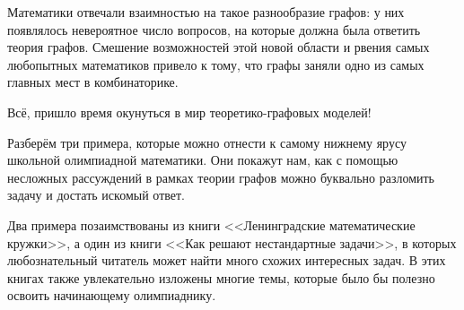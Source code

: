 	Математики отвечали взаимностью на такое разнообразие графов: у них появлялось невероятное число вопросов, на которые должна была ответить теория графов. Смешение возможностей этой новой области и рвения самых любопытных математиков привело к тому, что графы заняли одно из самых главных мест в комбинаторике. 

	Всё, пришло время окунуться в мир теоретико-графовых моделей!


	Разберём три примера, которые можно отнести к самому нижнему ярусу школьной олимпиадной математики. Они покажут нам, как с помощью несложных рассуждений в рамках теории графов можно буквально разломить задачу и достать искомый ответ.
	
	Два примера позаимствованы из книги <<Ленинградские математические кружки>>, а один из книги <<Как решают нестандартные задачи>>, в которых любознательный читатель может найти много схожих интересных задач. В этих книгах также увлекательно изложены многие темы, которые было бы полезно освоить начинающему олимпиаднику.
